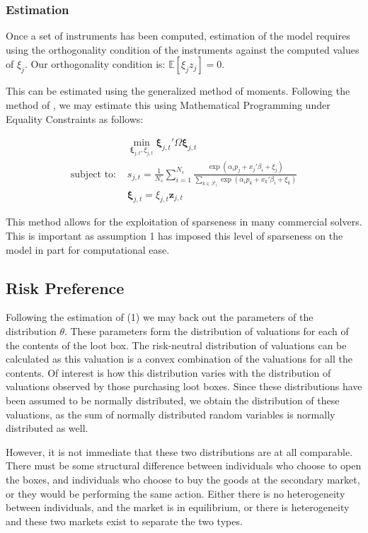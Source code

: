 \documentclass[12pt]{paper}
\newcommand{\exV}[1]{\mathbb{E} \left [ #1 \right ]}
\begin{document}
\subsubsection{Estimation}

Once a set of instruments has been computed, estimation of the model
requires using the orthogonality condition of the instruments against
the computed values of $\xi_j$. Our orthogonality condition is:
$\exV{\xi_j z_j} = 0$.

This can be estimated using the generalized method of
moments. Following the method of \cite*{MPEC}, we may estimate
this using Mathematical Programming under Equality Constraints as
follows: 

\begin{align}
  &\min_{\bm{\xi}_{j,t}, \xi_{j,t}} \bm{\xi}_{j,t}' \Omega \bm{\xi}_{j,t}\\
    \text{subject to: } &s_{j,t} = \frac{1}{N_s} \sum_{i=1}^{N_s}
                          \frac{\exp(\alpha_i p_j + x_j'\beta_i + \xi_j)}{\sum_{k\in
                          \mathcal{F}_t} \exp( \alpha_i p_k + x_k'\beta_i +
                          \xi_k)}\\
  &\bm{\xi}_{j,t} = \xi_{j,t} \bm{z}_{j,t}  
\end{align}

This  method allows for the exploitation of sparseness in many
commercial solvers. This is important as assumption 1 has imposed this
level of sparseness on the model in part for computational ease.

\subsection{Risk Preference}

Following the estimation of (1) we may back out the parameters of the
distribution $\theta$. These parameters form the distribution of valuations
for each of the contents of the loot box. The risk-neutral
distribution of valuations can be calculated as this valuation is a
convex combination of the valuations for all the contents. Of interest
is how this distribution varies with the distribution of valuations
observed by those purchasing loot boxes. Since these distributions
have been assumed to be normally distributed, we obtain the
distribution of these valuations, as the sum of normally distributed
random variables is normally distributed as well.

However, it is not immediate that these two distributions are at all
comparable. There must be some structural difference between
individuals who choose to open the boxes, and individuals who choose
to buy the goods at the secondary market, or they would be performing
the same action. Either there is no heterogeneity between individuals,
and the market is in equilibrium, or there is heterogeneity and these
two markets exist to separate the two types.
\end{document}
